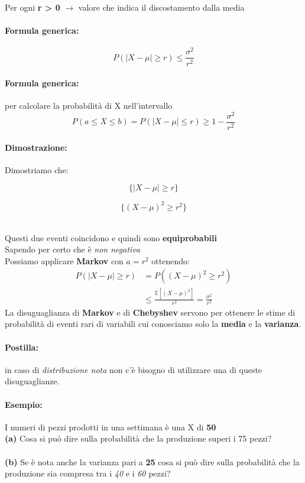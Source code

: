 \documentclass[]{article}
\newcommand{\ev}{\mathbb{E}[X]}
\renewcommand{\ev}[1]{\mathbb{E}[#1]}
\newcommand{\formula}{\paragraph{Formula generica:}}
\begin{document}
    \centerline{Per ogni \textbf{r > 0} $\longrightarrow$ valore che indica il discostamento dalla media}
    \formula 
    \[ P(|X - \mu| \geq r) \leq \frac{\sigma^2}{r^2} \]
    \formula per calcolare la probabilità di X nell'intervallo
    \[ P(a \leq X \leq b) = P(|X - \mu| \leq r) \geq 1 - \frac{\sigma^2}{r^2} \]
    \paragraph{Dimostrazione:} Dimostriamo che: \\
    \begin{minipage}{0.45\linewidth}
        \[ \{ |X - \mu | \geq r \} \]
    \end{minipage}
    \begin{minipage}{0.45\linewidth}
        \[ \{ ( X - \mu )^2 \geq r^2 \} \]
    \end{minipage} \\
    \linebreak[4]
    Questi due eventi coincidono e quindi sono \textbf{equiprobabili} \\
    Sapendo per certo che  è \textit{non negativa} \\
    Possiamo applicare \textbf{Markov} con $a = r^2$ ottenendo:
    \begin{equation*}
        \begin{split}
            P(|X - \mu | \geq r) & = P((X - \mu)^2 \geq r^2) \\
            & \leq \frac{\ev{(X - \mu)^2}}{r^2} = \frac{\sigma^2}{r^2}
        \end{split}
    \end{equation*}
    \linebreak
    La disuguaglianza di \textbf{Markov} e di \textbf{Chebyshev} servono per ottenere le stime di probabilità di eventi rari di variabili
    cui conosciamo solo la \textbf{media} e la \textbf{varianza}.

    \paragraph{Postilla:} in caso di \textit{distribuzione nota} non c'è bisogno di utilizzare una di queste disuguaglianze.

    \paragraph{Esempio:} I numeri di pezzi prodotti in una settimana è una X di \textbf{50} \\
    \textbf{(a)} Cosa si può dire sulla probabilità che la produzione superi i 75 pezzi?  \\ \\
    \textbf{(b)} Se è nota anche la varianza pari a \textbf{25} cosa si può dire sulla probabilità che la produzione sia compresa tra i \textit{40} e i \textit{60} pezzi? \\
\end{document}

